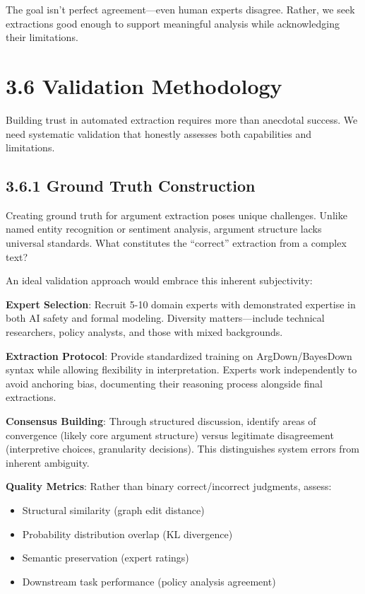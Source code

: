 \documentclass[
  11pt,
  letterpaper,
]{book}
\providecommand{\tightlist}{%
  \setlength{\itemsep}{0pt}\setlength{\parskip}{0pt}}
\begin{document}
The goal isn't perfect agreement---even human experts disagree. Rather,
we seek extractions good enough to support meaningful analysis while
acknowledging their limitations.

\section{3.6 Validation Methodology}\label{sec-validation-methodology}

Building trust in automated extraction requires more than anecdotal
success. We need systematic validation that honestly assesses both
capabilities and limitations.

\subsection{3.6.1 Ground Truth Construction}\label{sec-ground-truth}

Creating ground truth for argument extraction poses unique challenges.
Unlike named entity recognition or sentiment analysis, argument
structure lacks universal standards. What constitutes the ``correct''
extraction from a complex text?

An ideal validation approach would embrace this inherent subjectivity:

\textbf{Expert Selection}: Recruit 5-10 domain experts with demonstrated
expertise in both AI safety and formal modeling. Diversity
matters---include technical researchers, policy analysts, and those with
mixed backgrounds.

\textbf{Extraction Protocol}: Provide standardized training on
ArgDown/BayesDown syntax while allowing flexibility in interpretation.
Experts work independently to avoid anchoring bias, documenting their
reasoning process alongside final extractions.

\textbf{Consensus Building}: Through structured discussion, identify
areas of convergence (likely core argument structure) versus legitimate
disagreement (interpretive choices, granularity decisions). This
distinguishes system errors from inherent ambiguity.

\textbf{Quality Metrics}: Rather than binary correct/incorrect
judgments, assess:

\begin{itemize}
\tightlist
\item
  Structural similarity (graph edit distance)
\item
  Probability distribution overlap (KL divergence)
\item
  Semantic preservation (expert ratings)
\item
  Downstream task performance (policy analysis agreement)
\end{itemize}
\end{document}

